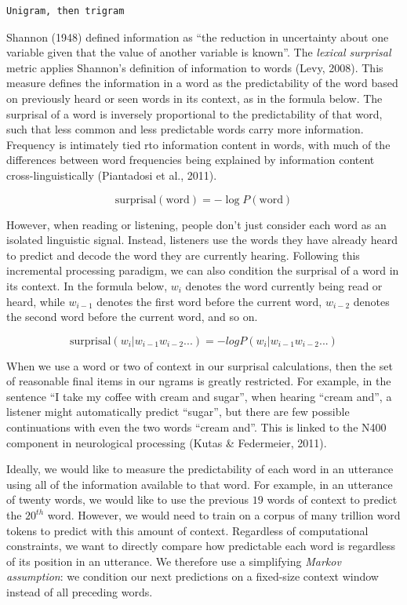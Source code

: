 \documentclass[10pt, letterpaper]{article}
\begin{document}
\begin{verbatim}
Unigram, then trigram
\end{verbatim}

Shannon (1948) defined information as ``the reduction in uncertainty
about one variable given that the value of another variable is known''.
The \emph{lexical surprisal} metric applies Shannon's definition of
information to words (Levy, 2008). This measure defines the information
in a word as the predictability of the word based on previously heard or
seen words in its context, as in the formula below. The surprisal of a
word is inversely proportional to the predictability of that word, such
that less common and less predictable words carry more information.
Frequency is intimately tied rto information content in words, with much
of the differences between word frequencies being explained by
information content cross-linguistically (Piantadosi et al., 2011).

\[\text{surprisal}(\text{word}) = -\log P(\text{word})\]

However, when reading or listening, people don't just consider each word
as an isolated linguistic signal. Instead, listeners use the words they
have already heard to predict and decode the word they are currently
hearing. Following this incremental processing paradigm, we can also
condition the surprisal of a word in its context. In the formula below,
\(w_i\) denotes the word currently being read or heard, while
\(w_{i-1}\) denotes the first word before the current word, \(w_{i-2}\)
denotes the second word before the current word, and so on.

\[\text{surprisal}(w_i|w_{i-1}w_{i-2}...) = -log P(w_i|w_{i-1}w_{i-2}...)\]

When we use a word or two of context in our surprisal calculations, then
the set of reasonable final items in our ngrams is greatly restricted.
For example, in the sentence ``I take my coffee with cream and sugar'',
when hearing ``cream and'', a listener might automatically predict
``sugar'', but there are few possible continuations with even the two
words ``cream and''. This is linked to the N400 component in
neurological processing (Kutas \& Federmeier, 2011).

Ideally, we would like to measure the predictability of each word in an
utterance using all of the information available to that word. For
example, in an utterance of twenty words, we would like to use the
previous \(19\) words of context to predict the \(20^{th}\) word.
However, we would need to train on a corpus of many trillion word tokens
to predict with this amount of context. Regardless of computational
constraints, we want to directly compare how predictable each word is
regardless of its position in an utterance. We therefore use a
simplifying \emph{Markov assumption}: we condition our next predictions
on a fixed-size context window instead of all preceding words.
\end{document}
